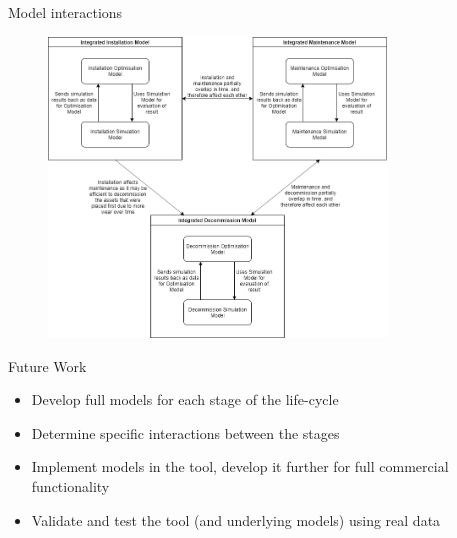 \documentclass{beamer}
\begin{document}
\begin{frame}{Model interactions}
\begin{figure}[t]
  \includegraphics[width=0.8\textwidth]{flowchart}
\centering
\end{figure}
\end{frame}


\begin{frame}{Future Work}
   \begin{itemize}
  	\item Develop full models for each stage of the life-cycle
  	\item Determine specific interactions between the stages
  	\item Implement models in the tool, develop it further for full commercial functionality
  	\item Validate and test the tool (and underlying models) using real data
  \end{itemize}
\end{frame}
\end{document}
